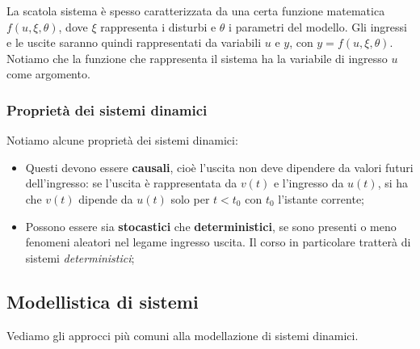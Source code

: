 \documentclass[a4paper,11pt]{article}
\begin{document}
\begin{center}
\end{center} 

La scatola sistema è spesso caratterizzata da una certa funzione matematica $f(u, \xi, \theta)$, dove $\xi$ rappresenta i disturbi e $\theta$ i parametri del modello.
Gli ingressi e le uscite saranno quindi rappresentati da variabili $u$ e $y$, con $y = f(u, \xi, \theta)$. 
Notiamo che la funzione che rappresenta il sistema ha la variabile di ingresso $u$ come argomento.

\begin{center}
\end{center}

\subsubsection{Proprietà dei sistemi dinamici}
Notiamo alcune proprietà dei sistemi dinamici:
\begin{itemize}
	\item Questi devono essere \textbf{causali}, cioè l'uscita non deve dipendere da valori futuri dell'ingresso: se l'uscita è rappresentata da $v(t)$ e l'ingresso da $u(t)$, si ha che $v(t)$ dipende da $u(t)$ solo per $t < t_0$ con $t_0$ l'istante corrente;
	\item Possono essere sia \textbf{stocastici} che \textbf{deterministici}, se sono presenti o meno fenomeni aleatori nel legame ingresso uscita. Il corso in particolare tratterà di sistemi \textit{deterministici};
\end{itemize}

\subsection{Modellistica di sistemi}
Vediamo gli approcci più comuni alla modellazione di sistemi dinamici.
\end{document}
